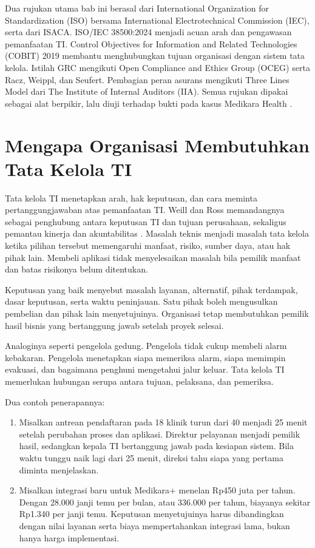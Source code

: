 Dua rujukan utama bab ini berasal dari International Organization for Standardization (ISO)
bersama International Electrotechnical Commission (IEC), serta dari ISACA. ISO/IEC
38500:2024 menjadi acuan arah dan pengawasan pemanfaatan TI. Control Objectives for
Information and Related Technologies (COBIT) 2019 membantu menghubungkan tujuan organisasi
dengan sistem tata kelola. Istilah GRC mengikuti Open Compliance and Ethics Group (OCEG)
serta Racz, Weippl, dan Seufert. Pembagian peran asurans mengikuti Three Lines Model dari
The Institute of Internal Auditors (IIA). Semua rujukan dipakai sebagai alat berpikir, lalu
diuji terhadap bukti pada kasus Medikara Health
\cite{iso38500-2024,cobit2019-intro,c01-oceg-grc,c01-racz2010,iia-tlm2026}.

\section{Mengapa Organisasi Membutuhkan Tata Kelola TI}

Tata kelola TI menetapkan arah, hak keputusan, dan cara meminta pertanggungjawaban atas
pemanfaatan TI. Weill dan Ross memandangnya sebagai penghubung antara keputusan TI dan
tujuan perusahaan, sekaligus pemantau kinerja dan akuntabilitas \cite{weill2004}. Masalah
teknis menjadi masalah tata kelola ketika pilihan tersebut memengaruhi manfaat, risiko,
sumber daya, atau hak pihak lain. Membeli aplikasi tidak menyelesaikan masalah bila
pemilik manfaat dan batas risikonya belum ditentukan.

Keputusan yang baik menyebut masalah layanan, alternatif, pihak terdampak, dasar
keputusan, serta waktu peninjauan. Satu pihak boleh mengusulkan pembelian dan pihak lain
menyetujuinya. Organisasi tetap membutuhkan pemilik hasil bisnis yang bertanggung jawab
setelah proyek selesai.

Analoginya seperti pengelola gedung. Pengelola tidak cukup membeli alarm kebakaran.
Pengelola menetapkan siapa memeriksa alarm, siapa memimpin evakuasi, dan bagaimana
penghuni mengetahui jalur keluar. Tata kelola TI memerlukan hubungan serupa antara tujuan,
pelaksana, dan pemeriksa.

Dua contoh penerapannya:
\begin{enumerate}
  \item Misalkan antrean pendaftaran pada 18 klinik turun dari 40 menjadi 25 menit
  setelah perubahan proses dan aplikasi. Direktur pelayanan menjadi pemilik hasil,
  sedangkan kepala TI bertanggung jawab pada kesiapan sistem. Bila waktu tunggu naik lagi
  dari 25 menit, direksi tahu siapa yang pertama diminta menjelaskan.
  \item Misalkan integrasi baru untuk Medikara+ menelan Rp450 juta per tahun. Dengan
  28.000 janji temu per bulan, atau 336.000 per tahun, biayanya sekitar Rp1.340 per janji
  temu. Keputusan menyetujuinya harus dibandingkan dengan nilai layanan serta biaya
  mempertahankan integrasi lama, bukan hanya harga implementasi.
\end{enumerate}

